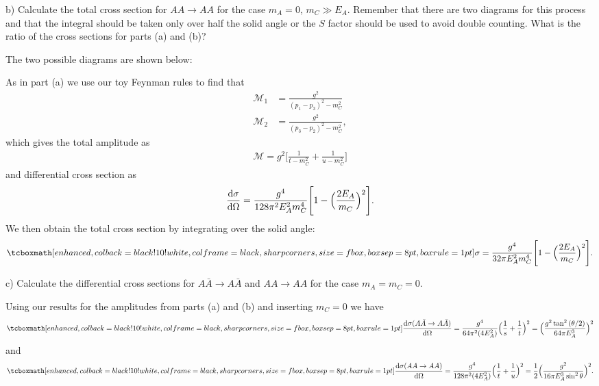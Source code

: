 b) Calculate the total cross section for $A A \rightarrow A A$ for the case $m_{A} = 0$, $m_{C} \gg E_{A}$.
Remember that there are two diagrams for this process and that the integral should be taken only over half the solid angle or the $S$ factor should be used to avoid double counting.
What is the ratio of the cross sections for parts (a) and (b)?

The two possible diagrams are shown below:

As in part (a) we use our toy Feynman rules to find that
\begin{align}
    \label{eq:amps-b}
    \mathcal{M}_{1} &= \frac{g^2}{(p_1 - p_3)^2 - m_{C}^2} \\
    \mathcal{M}_{2} &= \frac{g^2}{(p_3 - p_2)^2 - m_{C}^2}
,\end{align}
which gives the total amplitude as
\begin{eqnarray}
    \label{eq:amp-b}
    \mathcal{M} = g^2 \Big[ \frac{1}{t - m_{C}^2} + \frac{1}{u - m_{C}^2} \Big]
\end{eqnarray}
and differential cross section as
\begin{eqnarray}
    \label{eq:dxsec-b}
    \dv{\sigma}{\Omega} = \frac{g^{4}}{128 \pi^2 E_{A}^2 m_{C}^{4}} \Bigg[ 1 - \Big( \frac{2E_{A}}{m_{C}} \Big)^2 \Bigg]
.\end{eqnarray}
We then obtain the total cross section by integrating over the solid angle:
\begin{eqnarray}
    \label{eq:xsec-b}
    \eqbox{
        \sigma = \frac{g^{4}}{32 \pi E_{A}^2 m_{C}^{4}} \Bigg[ 1 - \Big( \frac{2 E_{A}}{m_{C}} \Big)^2 \Bigg]
    } 
.\end{eqnarray}



c) Calculate the differential cross sections for $A \bar{A} \rightarrow A \bar{A}$ and $A A \rightarrow A A$ for the case $m_{A} = m_{C} = 0$.

Using our results for the amplitudes from parts (a) and (b) and inserting $m_{C} = 0$ we have
\begin{eqnarray}
    \label{eq:xsec1}
    \eqbox{
    \dv{\sigma(A \bar{A} \rightarrow A \bar{A})}{\Omega} = \frac{g^{4}}{64 \pi^2 (4 E_{A}^2)} \Big( \frac{1}{s} + \frac{1}{t} \Big)^2 = \Big( \frac{g^2 \tan^2{(\theta/2)}}{64 \pi E_{A}^3} \Big)^2
}
\end{eqnarray}
and
\begin{eqnarray}
    \label{eq:xsec2}
    \eqbox{
    \dv{\sigma(AA \rightarrow AA)}{\Omega} = \frac{g^{4}}{128 \pi^2 (4 E_{A}^2)} \Big( \frac{1}{t} + \frac{1}{u} \Big)^2 = \frac{1}{2} \Big( \frac{g^{2}}{16 \pi E_{A}^3 \sin^2{\theta}} \Big) ^2
}
.\end{eqnarray}


